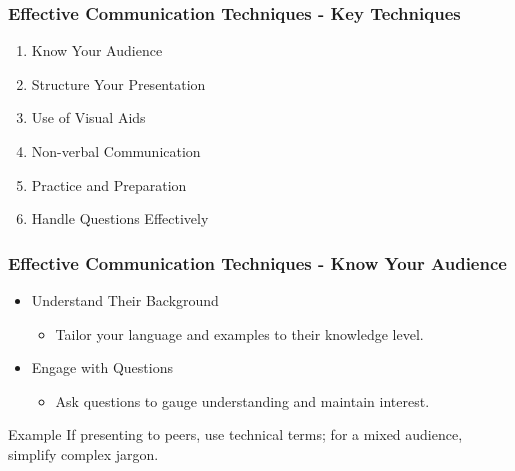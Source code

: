 \documentclass{beamer}
\begin{document}
\begin{frame}[fragile]
    \frametitle{Effective Communication Techniques - Key Techniques}
    
    \begin{enumerate}
        \item Know Your Audience
        \item Structure Your Presentation
        \item Use of Visual Aids
        \item Non-verbal Communication
        \item Practice and Preparation
        \item Handle Questions Effectively
    \end{enumerate}
\end{frame}

\begin{frame}[fragile]
    \frametitle{Effective Communication Techniques - Know Your Audience}
    
    \begin{itemize}
        \item Understand Their Background
        \begin{itemize}
            \item Tailor your language and examples to their knowledge level.
        \end{itemize}
        \item Engage with Questions
        \begin{itemize}
            \item Ask questions to gauge understanding and maintain interest.
        \end{itemize}
    \end{itemize}
    
    \begin{block}{Example}
        If presenting to peers, use technical terms; for a mixed audience, simplify complex jargon.
    \end{block}
\end{frame}
\end{document}
